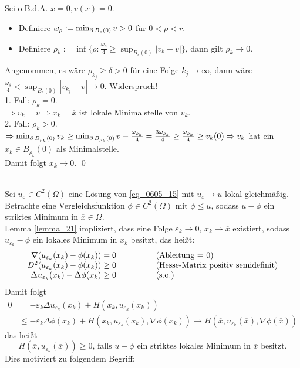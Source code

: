 	Sei o.B.d.A. $\overline{x} = 0, v(\overline{x})=0$. \begin{itemize}
		\item Definiere $\omega_\rho := \min_{\operatorname{\partial} B_\rho(0)} v > 0$ für $0 < \rho < r$.
		\item Definiere $\rho_k := \inf\{ \rho : \frac{\omega_\rho}{4} \geq \sup_{B_r(0)} |v_k-v|\}$, dann gilt $\rho_k \rightarrow 0$.
	\end{itemize}
	Angenommen, es wäre $\rho_{k_j} \geq \delta > 0$ für eine Folge $k_j \rightarrow \infty$, dann wäre $\frac{\omega_\delta}{4} < \sup_{B_r(0)} |v_{k_j} - v| \rightarrow 0$. Widerspruch! \\
	1. Fall: $\rho_k = 0$. \\
	$\Rightarrow v_k = v \Rightarrow x_k = \overline{x}$ ist lokale Minimalstelle von $v_k$. \\
	2. Fall: $\rho_k > 0$. \\
	$\Rightarrow \min_{\operatorname{\partial} B_{\rho_k}(0)} v_k \geq \min_{\operatorname{\partial} B_{\rho_k}(0)} v - \frac{\omega_{\rho_k}}{4} = \frac{3 \omega_{\rho_k}}{4} \geq \frac{\omega_{\rho_k}}{4} \geq v_k(0) \Rightarrow v_k$ hat ein $x_k \in B_{\rho_k}(0)$ als Minimalstelle. \\
	Damit folgt $x_k \rightarrow 0$. \qed

\mbox{} \\
Sei $u_\varepsilon \in C^2(\Omega)$ eine Lösung von \eqref{eq_0605_15} mit $u_\varepsilon \rightarrow u$ lokal gleichmäßig. Betrachte eine Vergleichsfunktion $\phi \in C^2(\Omega)$ mit $\phi \leq u$, sodass $u-\phi$ ein striktes Minimum in $\overline{x} \in \Omega$. \\
Lemma \ref{lemma_21} impliziert, dass eine Folge $\varepsilon_k \rightarrow 0$, $x_k \rightarrow \overline{x}$ existiert, sodass $u_{\varepsilon_k} - \phi$ ein lokales Minimum in $x_k$ besitzt, das heißt:
\[ \begin{array}{rcl}
	\nabla(u_{\varepsilon_k}(x_k) - \phi(x_k)) = 0	&	\hspace*{1cm}	&	\text{(Ableitung = 0)} \\
	D^2(u_{\varepsilon_k}(x_k) - \phi(x_k)) \geq 0	&	&	\text{(Hesse-Matrix positiv semidefinit)} \\
	\Delta u_{\varepsilon_k}(x_k) - \Delta \phi(x_k) \geq 0	&	& \text{(s.o.)}
\end{array} \]
Damit folgt
\begin{equation}
\begin{aligned}
	0 &= -\varepsilon_k \Delta u_{\varepsilon_k}(x_k) + H(x_k,u_{\varepsilon_k}(x_k)) \\ \label{eq_0605_17}
	&\leq -\varepsilon_k \Delta\phi (x_k) + H(x_k,u_{\varepsilon_k}(x_k),\nabla \phi (x_k)) \rightarrow H(\overline{x},u_{\varepsilon_k}(\overline{x}),\nabla \phi (\overline{x}))
\end{aligned}
\end{equation}
das heißt
\[ H(\overline{x},u_{\varepsilon_k}(\overline{x})) \geq 0 \text{, falls } u-\phi \text{ ein striktes lokales Minimum in } \overline{x} \text{ besitzt.} \]
Dies motiviert zu folgendem Begriff:

